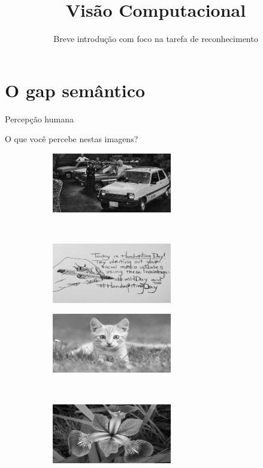 \documentclass{beamer}
\title{Visão Computacional}
\subtitle{Breve introdução com foco na tarefa de reconhecimento}
\author{}
\institute[]
{
	\inst{1}%
}
\date{}
\begin{document}
\frame{\titlepage}

\section{O gap semântico}

    \begin{frame}{Percepção humana}

        O que você percebe nestas imagens?

        \begin{figure}
            \centering
            \begin{subfigure}[b]{0.5\textwidth}
                \centering
                \includegraphics[height=2.6cm]{img/gcarpeople.jpg}
                \label{fig:carpeople}
            \end{subfigure}~
            \begin{subfigure}[b]{0.5\textwidth}
                \centering
                \includegraphics[height=2.6cm]{img/ghandwriting.jpg}
                \label{fig:handwriting}
            \end{subfigure}

            \begin{subfigure}[b]{0.5\textwidth}
                \centering
                \includegraphics[height=2.6cm]{img/gcat.jpg}
                \label{fig:carpeople}
            \end{subfigure}~
            \begin{subfigure}[b]{0.5\textwidth}
                \centering
                \includegraphics[height=2.6cm]{img/giris.jpg}
                \label{fig:iris}
            \end{subfigure}
        \end{figure}


\end{frame}
\end{document}
